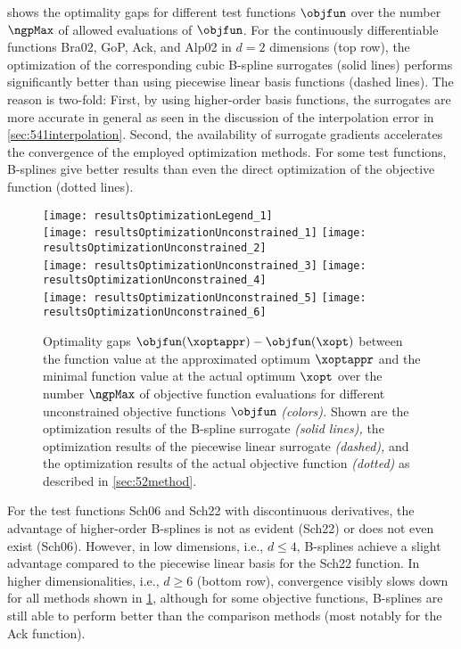 shows the optimality gaps for different test functions $\objfun$
over the number $\ngpMax$ of allowed evaluations of $\objfun$.
For the continuously differentiable functions Bra02, GoP, Ack, and Alp02
in $d = 2$ dimensions (top row),
the optimization of the corresponding cubic B-spline surrogates (solid lines)
performs significantly better than using piecewise linear basis functions
(dashed lines).
The reason is two-fold:
First, by using higher-order basis functions, the surrogates are more accurate
in general as seen in the discussion of the interpolation error in
\cref{sec:541interpolation}.
Second, the availability of surrogate gradients accelerates the
convergence of the employed optimization methods.
For some test functions, B-splines give better results than even
the direct optimization of the objective function (dotted lines).

\begin{figure}
  \texttt{[image: resultsOptimizationLegend\_1]}\\[2mm]%
  \texttt{[image: resultsOptimizationUnconstrained\_1]}%
  \hfill%
  \texttt{[image: resultsOptimizationUnconstrained\_2]}%
  \\[2mm]%
  \texttt{[image: resultsOptimizationUnconstrained\_3]}%
  \hfill%
  \texttt{[image: resultsOptimizationUnconstrained\_4]}%
  \\[2mm]%
  \texttt{[image: resultsOptimizationUnconstrained\_5]}%
  \hfill%
  \texttt{[image: resultsOptimizationUnconstrained\_6]}%
  \caption[Optimality gaps for different objective functions (unconstrained)]{%
    Optimality gaps $\objfun(\xoptappr) - \objfun(\xopt)$ between
    the function value at the approximated optimum $\xoptappr$ and
    the minimal function value at the actual optimum $\xopt$
    over the number $\ngpMax$ of objective function evaluations
    for different unconstrained
    objective functions $\objfun$ \emph{(colors).}
    Shown are the optimization results of the B-spline surrogate
    \emph{(solid lines),}
    the optimization results of the piecewise linear surrogate
    \emph{(dashed),} and
    the optimization results of the actual objective function
    \emph{(dotted)} as described in \cref{sec:52method}.%
  }%
  \label{fig:resultsOptimizationUnconstrainedTestFunctions}%
\end{figure}

For the test functions Sch06 and Sch22 with discontinuous derivatives,
the advantage of higher-order B-splines is not as evident (Sch22) or
does not even exist (Sch06).
However, in low dimensions, i.e., $d \le 4$, B-splines
achieve a slight advantage compared to the piecewise linear basis
for the Sch22 function.
In higher dimensionalities, i.e., $d \ge 6$ (bottom row),
convergence visibly slows down for all methods shown in
\cref{fig:resultsOptimizationUnconstrainedTestFunctions},
although for some objective functions, B-splines are still able
to perform better than the comparison methods
(most notably for the Ack function).

